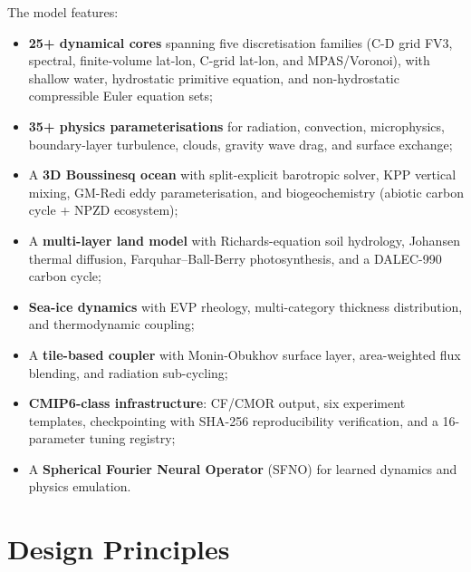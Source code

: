 \documentclass[11pt,twoside]{report}
\begin{document}
The model features:
\begin{itemize}[nosep]
  \item \textbf{25+ dynamical cores} spanning five discretisation families
    (C-D grid FV3, spectral, finite-volume lat-lon, C-grid lat-lon, and
    MPAS/Voronoi), with shallow water, hydrostatic primitive equation,
    and non-hydrostatic compressible Euler equation sets;
  \item \textbf{35+ physics parameterisations} for radiation, convection,
    microphysics, boundary-layer turbulence, clouds, gravity wave drag,
    and surface exchange;
  \item A \textbf{3D Boussinesq ocean} with split-explicit barotropic
    solver, KPP vertical mixing, GM-Redi eddy parameterisation, and
    biogeochemistry (abiotic carbon cycle + NPZD ecosystem);
  \item A \textbf{multi-layer land model} with Richards-equation
    soil hydrology, Johansen thermal diffusion, Farquhar--Ball-Berry
    photosynthesis, and a DALEC-990 carbon cycle;
  \item \textbf{Sea-ice dynamics} with EVP rheology, multi-category
    thickness distribution, and thermodynamic coupling;
  \item A \textbf{tile-based coupler} with Monin-Obukhov surface layer,
    area-weighted flux blending, and radiation sub-cycling;
  \item \textbf{CMIP6-class infrastructure}: CF/CMOR output, six
    experiment templates, checkpointing with SHA-256 reproducibility
    verification, and a 16-parameter tuning registry;
  \item A \textbf{Spherical Fourier Neural Operator} (SFNO) for
    learned dynamics and physics emulation.
\end{itemize}

\section{Design Principles}
\end{document}
